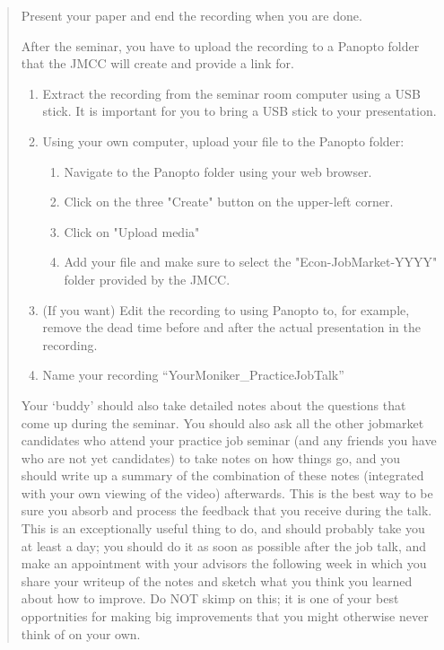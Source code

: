 \documentclass{\classes/econtex}
\begin{document}
\begin{enumerate}
\begin{quote}
    Present your paper and end the recording when you are done.
    
    After the seminar, you have to upload the recording to a Panopto folder that the JMCC will create and provide a link for.
    \begin{enumerate}
    	\item Extract the recording from the seminar room computer using a USB stick. It is important for you to bring a USB stick to your presentation.
 		\item Using your own computer, upload your file to the Panopto folder:
 		\begin{enumerate}
 			\item Navigate to the Panopto folder using your web browser.
 			\item Click on the three "Create" button on the upper-left corner.
 			\item Click on "Upload media"
 			\item Add your file and make sure to select the "Econ-JobMarket-YYYY" folder provided by the JMCC.
 		\end{enumerate}
 		\item (If you want) Edit the recording to using Panopto to, for example, remove the dead time before and after the actual presentation in the recording.
 		\item Name your recording ``YourMoniker\_PracticeJobTalk''
    \end{enumerate}  

    Your `buddy' should also take detailed notes about the questions
    that come up during the seminar.  You should also ask all the other
    jobmarket candidates who attend your practice job seminar (and any
    friends you have who are not yet candidates) to take notes on how
    things go, and you should write up a summary of the combination of
    these notes (integrated with your own viewing of the video)
    afterwards.  This is the best way to be sure you absorb and process
    the feedback that you receive during the talk.  This is an
    exceptionally useful thing to do, and should probably take you at least
    a day; you should do it as soon as possible after the job talk, and
    make an appointment with your advisors the following week in which
    you share your writeup of the notes and sketch what you think you
    learned about how to improve.  Do NOT skimp on this; it is one of
    your best opportnities for making big improvements that you might
    otherwise never think of on your own.


\end{quote}
\end{enumerate}
\end{document}
